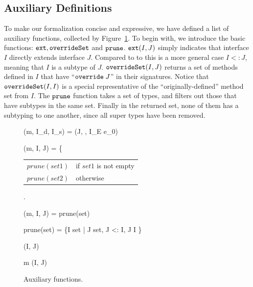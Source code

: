 \subsection{Auxiliary Definitions}\label{subsec:auxdefs}

To make our formalization concise and expressive, we have defined a list of
auxiliary functions, collected by Figure~\ref{fig:auxfunc}. To begin with, we
introduce the basic functions: $\texttt{ext}, \texttt{overrideSet}$ and $\texttt{prune}$. $\texttt{ext}(I, J)$
simply indicates that interface $I$ directly extends interface $J$. Compared to
to this is a more general case $I <: J$, meaning that $I$ is a subtype of $J$.
$\texttt{overrideSet}(I, J)$ returns a set of methods defined in $I$ that have ``$\texttt{override} \; J$''
in their signatures. Notice that $\texttt{overrideSet}(I, I)$ is a special representative of
the ``originally-defined'' method set from $I$. The $\texttt{prune}$ function takes a set of
types, and filters out those that have subtypes in the same set. Finally in the returned set,
none of them has a subtyping to one another, since all super types have been removed.

\begin{figure}[t]
	\begin{mathpar}
		{\mbody(m, I_d, I_s) = (J,  \; , I_E \; e_0)}
	
	{\mostSpecific(m, I, J) = \left\{{\begin{tabular}{ll}
				$prune(set1)$ & if $set1$ is not empty \\ $prune(set2)$ & otherwise
			\end{tabular}}\right.}
	
		{\mostSpecificOverride(m, I, J) = prune(set)}
	
	prune(set) = \{I \in set \; | \; \nexists J \in set, J <: I, J \neq I \}
	
	{\ext(I, J)}
	
	{m \in \overrideSet(I, J)}
	\end{mathpar}
	\caption{Auxiliary functions.}\label{fig:auxfunc}
\end{figure}

